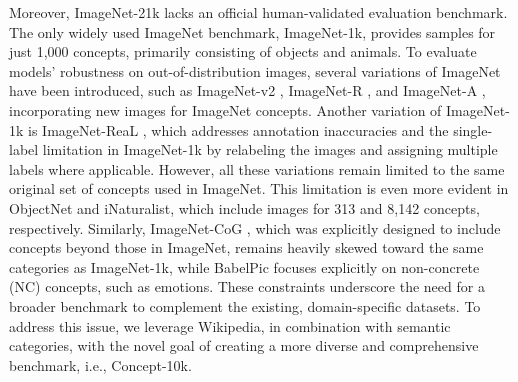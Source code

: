 \documentclass[11pt]{article}
\newcommand{\benchmark}{Concept-10k}
\begin{document}
Moreover, ImageNet-21k lacks an official human-validated evaluation benchmark.
The only widely used ImageNet benchmark, ImageNet-1k, provides samples for just 1,000 concepts, primarily consisting of objects and animals. To evaluate models’ robustness on out-of-distribution images, several variations of ImageNet have been introduced, such as ImageNet-v2 \cite{recht2019imagenet}, ImageNet-R \cite{hendrycks2021many}, and ImageNet-A \cite{hendrycks2021natural}, incorporating new images for ImageNet concepts. 
Another variation of ImageNet-1k is ImageNet-ReaL \cite{beyer2020we}, which addresses annotation inaccuracies and the single-label limitation in ImageNet-1k by relabeling the images and assigning multiple labels where applicable.
However, all these variations remain limited to the same original set of concepts used in ImageNet.
This limitation is even more evident in ObjectNet and iNaturalist, which include images for 313 and 8,142 concepts, respectively.
Similarly, ImageNet-CoG \citep{sariyildiz2021concept}, which was explicitly designed to include concepts beyond those in ImageNet, remains heavily skewed toward the same categories as ImageNet-1k, while BabelPic \citep{calabrese2020fatality} focuses explicitly on non-concrete (NC) concepts, such as emotions. 
These constraints underscore the need for a broader benchmark to complement the existing, domain-specific datasets.
To address this issue, we leverage Wikipedia, in combination with semantic categories, with the novel goal of creating a more diverse and comprehensive benchmark, i.e., \benchmark.
\end{document}
